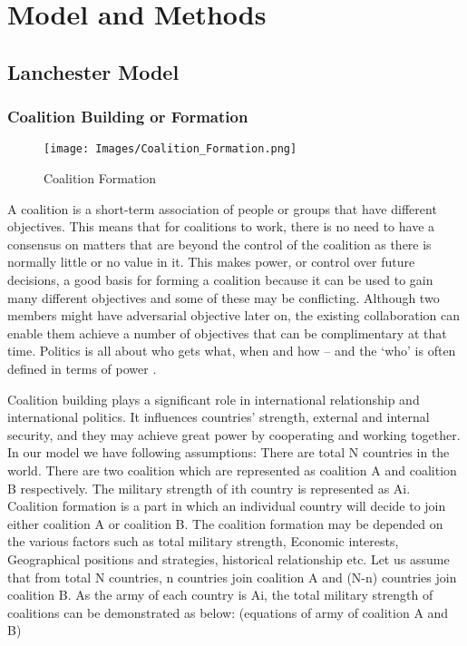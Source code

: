 \documentclass[oneside,12pt]{report}
\begin{document}
\chapter{Model and Methods}

\section{Lanchester Model}


\subsection{Coalition Building or Formation}



\begin{figure} [h]
    \centering
    \texttt{[image: Images/Coalition\_Formation.png]}
    \caption{Coalition Formation}
    \label{fig:}
\end{figure}


A coalition is a short-term association of people or groups that have different objectives. This means that for coalitions to work, there is no need to have a consensus on matters that are beyond the control of the coalition as there is normally little or no value in it. This makes power, or control over future decisions, a good basis for forming a coalition because it can be used to gain many different objectives and some of these may be conflicting. Although two members might have adversarial objective later on, the existing collaboration can enable them achieve a number of objectives that can be complimentary at that time. Politics is all about who gets what, when and how – and the ‘who’ is often defined in terms of power \cite{r6}.

Coalition building plays a significant role in international relationship and international politics. It influences countries’ strength, external and internal security, and they may achieve great power by cooperating and working together. In our model we have following assumptions: There are total N countries in the world. There are two coalition which are represented as coalition A and coalition B respectively. The military strength of ith country is represented as Ai. Coalition formation is a part in which an individual country will decide to join either coalition A or coalition B. The coalition formation may be depended on the various factors such as total military strength, Economic interests, Geographical positions and strategies, historical relationship etc. Let us assume that from total N countries, n countries join coalition A and (N-n) countries join coalition B. As the army of each country is Ai, the total military strength of coalitions can be demonstrated as below: (equations of army of coalition A and B)
\end{document}
